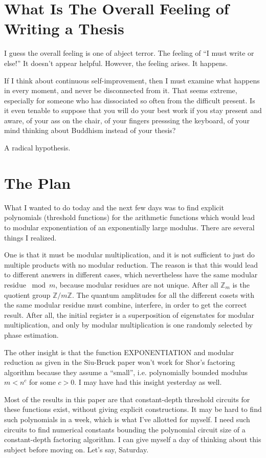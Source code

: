 \documentclass{article}
\begin{document}
\section{What Is The Overall Feeling of Writing a Thesis}

I guess the overall feeling is one of abject terror. The feeling of
``I must write or else!'' It doesn't appear helpful. However, the
feeling arises. It happens.

If I think about continuous self-improvement, then I must examine
what happens in every moment, and never be disconnected from it.
That seems extreme, especially for someone who has dissociated so
often from the difficult present. Is it even tenable to suppose
that you will do your best work if you stay present and aware,
of your ass on the chair, of your fingers presssing the keyboard,
of your mind thinking about Buddhism instead of your thesis?

A radical hypothesis.

\section{The Plan}

What I wanted to do today and the next few days was to find explicit
polynomials (threshold functions) for the arithmetic functions
which would lead to modular exponentiation of an exponentially large
modulus. There are several things I realized.

One is that it must be modular multiplication, and it is not sufficient
to just do multiple products with no modular reduction. The reason is
that this would lead to different answers in different cases, which
nevertheless have the same modular residue $\bmod m$, because
modular residues are not unique. After all $\mathbb{Z}_m$ is the quotient
group $\mathbb{Z}/m\mathbb{Z}$. The quantum amplitudes for all the
different cosets with the same modular residue must combine, interfere,
in order to get the correct result. After all, the initial register is
a superposition of eigenstates for modular multiplication, and only by
modular multiplication is one randomly selected by phase estimation.

The other insight is that the function EXPONENTIATION and modular reduction
as given in the Siu-Bruck paper won't work for Shor's factoring algorithm
because they assume a ``small'', i.e. polynomially bounded modulus
$m < n^c$ for some $c>0$. I may have had this insight yesterday as well.

Most of the results in this paper are that constant-depth threshold
circuits for these functions exist, without giving explicit constructions.
It may be hard to find such polynomials in a week, which is what I've allotted for myself. I need such circuits to find numerical constants
bounding the polynomial circuit size of a constant-depth factoring
algorithm. I can give myself a day of thinking about this subject before
moving on. Let's say, Saturday.
\end{document}
